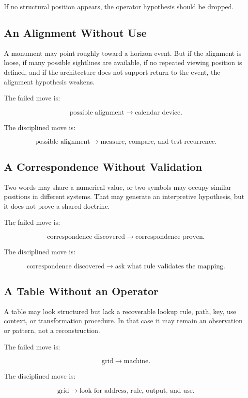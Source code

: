 \documentclass[11pt]{book}
\begin{document}
If no structural position appears, the operator hypothesis should be dropped.

\subsection{An Alignment Without Use}

A monument may point roughly toward a horizon event. But if the alignment is loose, if many possible sightlines are available, if no repeated viewing position is defined, and if the architecture does not support return to the event, the alignment hypothesis weakens.

The failed move is:

\[
\text{possible alignment} \rightarrow \text{calendar device}.
\]

The disciplined move is:

\[
\text{possible alignment} \rightarrow \text{measure, compare, and test recurrence}.
\]

\subsection{A Correspondence Without Validation}

Two words may share a numerical value, or two symbols may occupy similar positions in different systems. That may generate an interpretive hypothesis, but it does not prove a shared doctrine.

The failed move is:

\[
\text{correspondence discovered} \rightarrow \text{correspondence proven}.
\]

The disciplined move is:

\[
\text{correspondence discovered} \rightarrow \text{ask what rule validates the mapping}.
\]

\subsection{A Table Without an Operator}

A table may look structured but lack a recoverable lookup rule, path, key, use context, or transformation procedure. In that case it may remain an observation or pattern, not a reconstruction.

The failed move is:

\[
\text{grid} \rightarrow \text{machine}.
\]

The disciplined move is:

\[
\text{grid} \rightarrow \text{look for address, rule, output, and use}.
\]
\end{document}
